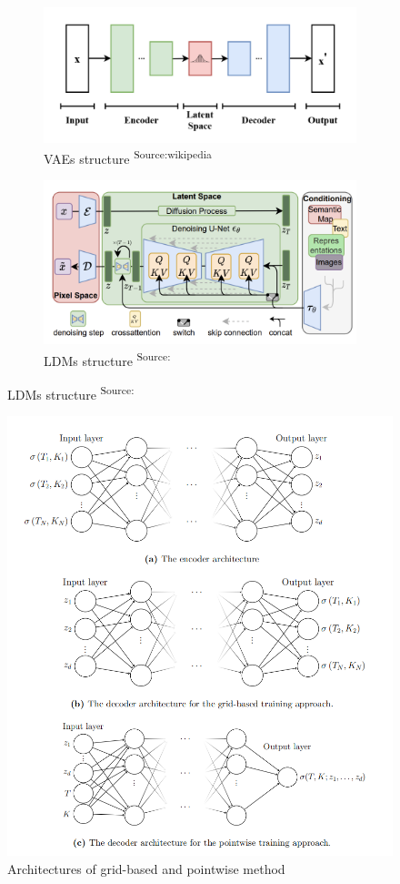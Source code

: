 \documentclass{article}
\begin{document}
\begin{figure}[htp]
    \centering
    \begin{subfigure}{0.45\textwidth}
    \centering
        \includegraphics[width=\textwidth]{img/vaewiki.png}
        \caption{VAEs structure \textsuperscript{Source:wikipedia}}
        \label{fig:a}
    \end{subfigure}
    \hfill
        \begin{subfigure}{0.45\textwidth}
    \centering
        \includegraphics[width=\textwidth]{img/ldm.png}
        \caption{LDMs structure \textsuperscript{Source:\cite{rombach2022highresolutionimagesynthesislatent}}}
        \label{fig:c}
    \end{subfigure}

\end{figure}


\begin{figure}[htp]
    \centering
    \includegraphics[width=0.6\linewidth]{img/vae_vol.png}
    \caption{Architectures of grid-based and pointwise method}
    \label{fig:b}
\end{figure}
\end{document}
